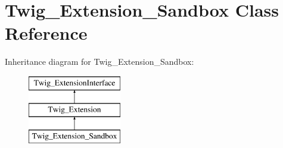 \hypertarget{class_twig___extension___sandbox}{}\section{Twig\+\_\+\+Extension\+\_\+\+Sandbox Class Reference}
\label{class_twig___extension___sandbox}
Inheritance diagram for Twig\+\_\+\+Extension\+\_\+\+Sandbox\+:\begin{figure}[H]
\begin{center}
\leavevmode
\includegraphics[height=3.000000cm]{class_twig___extension___sandbox}
\end{center}
\end{figure}
